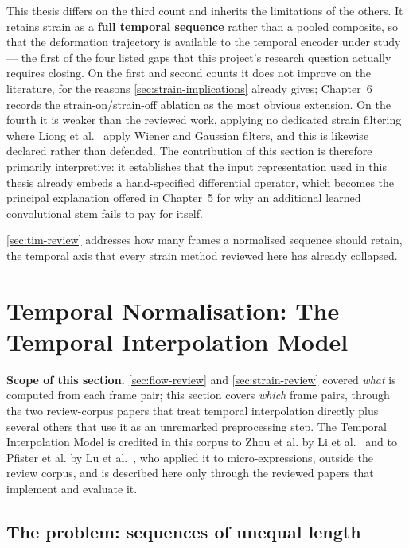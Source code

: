 This thesis differs on the third count and inherits the limitations of the others. It retains strain as a \textbf{full temporal sequence} rather than a pooled composite, so that the deformation trajectory is available to the temporal encoder under study --- the first of the four listed gaps that this project's research question actually requires closing. On the first and second counts it does not improve on the literature, for the reasons \autoref{sec:strain-implications} already gives; Chapter~6 records the strain-on/strain-off ablation as the most obvious extension. On the fourth it is weaker than the reviewed work, applying no dedicated strain filtering where Liong et al.~\cite{liong2014a} apply Wiener and Gaussian filters, and this is likewise declared rather than defended. The contribution of this section is therefore primarily interpretive: it establishes that the input representation used in this thesis already embeds a hand-specified differential operator, which becomes the principal explanation offered in Chapter~5 for why an additional learned convolutional stem fails to pay for itself.

\autoref{sec:tim-review} addresses how many frames a normalised sequence should retain, the temporal axis that every strain method reviewed here has already collapsed.


\section{Temporal Normalisation: The Temporal Interpolation Model}
\label{sec:tim-review}

\textbf{Scope of this section.} \autoref{sec:flow-review} and \autoref{sec:strain-review} covered \textit{what} is computed from each frame pair; this section covers \textit{which} frame pairs, through the two review-corpus papers that treat temporal interpolation directly plus several others that use it as an unremarked preprocessing step. The Temporal Interpolation Model is credited in this corpus to Zhou et al. by Li et al.~\cite{liX2013,liX2018} and to Pfister et al. by Lu et al.~\cite{lu2015}, who applied it to micro-expressions, outside the review corpus, and is described here only through the reviewed papers that implement and evaluate it.

\subsection{The problem: sequences of unequal length}
\label{sec:tim-problem}

